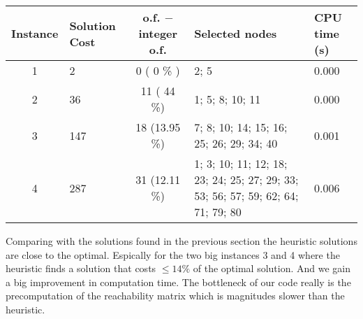 \begin{table}[h!]
	\centering
	\begin{tabularx}{\textwidth}{|c|X|c|X|X|}
		\hline
		\textbf{Instance} & \textbf{Solution Cost} & \textbf{o.f. $-$ integer o.f.} & \textbf{Selected nodes} & \textbf{CPU time (s)} \\
		\hline
		1 & 2 & 0 ( 0 \% ) & 2; 5 & 0.000 \\
		\hline
		2 & 36 & 11 ( 44 \%) & 1; 5; 8; 10; 11 & 0.000 \\
		\hline
		3 & 147 & 18 (13.95 \%) &7; 8; 10; 14; 15; 16; 25; 26; 29; 34; 40 & 0.001 \\
		\hline
		4 & 287 & 31 (12.11 \%) & 1; 3; 10; 11; 12; 18; 23; 24; 25; 27; 29; 33; 53; 56; 57; 59; 62; 64; 71; 79; 80 & 0.006 \\
		\hline
	\end{tabularx}
\end{table}

Comparing with the solutions found in the previous section the heuristic solutions are close to the optimal.
Espically for the two big instances 3 and 4 where the heuristic finds a solution that costs $\le 14\%$ of the optimal solution.
And we gain a big improvement in computation time.
The bottleneck of our code really is the precomputation of the reachability matrix which is magnitudes slower than the heuristic.
